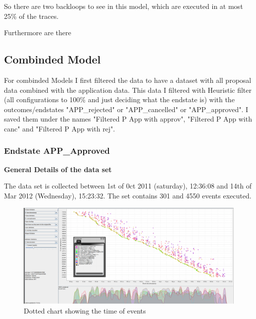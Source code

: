 So there are two backloops to see in this model, which are executed in at most 25\% of the traces.

Furthermore are there 

\subsection{Combinded Model}

For combinded Models I first filtered the data to have a dataset with all proposal data combined with the application data. This data I filtered with Heuristic filter (all configurations to 100\% and just deciding what the endstate is) with the outcomes/endstates "APP\_rejected" or "APP\_cancelled" or "APP\_approved". I saved them under the names "Filtered P App with approv", "Filtered P App with canc" and "Filtered P App with rej". 

\subsubsection{Endstate APP\_Approved}

\textbf{General Details of the data set}

The data set is collected between 1st of 0ct 2011 (saturday), 12:36:08 and 14th of Mar 2012 (Wednesday), 15:23:32. The set contains 301 and 4550 events executed. 

\begin{figure}[!htbp]
\centering
\includegraphics[height = 0.2\textheight]{ApprovalDot.PNG}
\caption{Dotted chart showing the time of events}
\label{fig:ApprovTimeFlow}
\end{figure}

